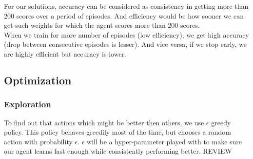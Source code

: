 For our solutions, accuracy can be considered as consistency in getting more than 200 scores over a period of episodes. And efficiency would be how sooner we can get such weights for which the agent scores more than 200 scores. \\

When we train for more number of episodes (low efficiency), we get high accuracy (drop between consecutive episodes is lesser). And vice versa, if we stop early, we are highly efficient but accuracy is lower.

\subsection{Optimization}
\subsubsection{Exploration}
To find out that actions which might be better then others, we use $\epsilon$ greedy policy. This policy behaves greedily most of the time, but chooses a random action with probability $\epsilon$. $\epsilon$ will be a hyper-parameter played with to make sure our agent learns fast enough while consistently performing better. REVIEW
